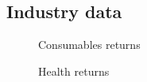 \documentclass[
  letterpaper,
  DIV=11,
  numbers=noendperiod]{scrartcl}
\begin{document}
\subsection{Industry data}\label{industry-data}

\begin{figure}[H]


\caption{\label{fig-cons}Consumables returns}

\end{figure}%

\begin{figure}[H]


\caption{\label{fig-health}Health returns}

\end{figure}%
\end{document}
